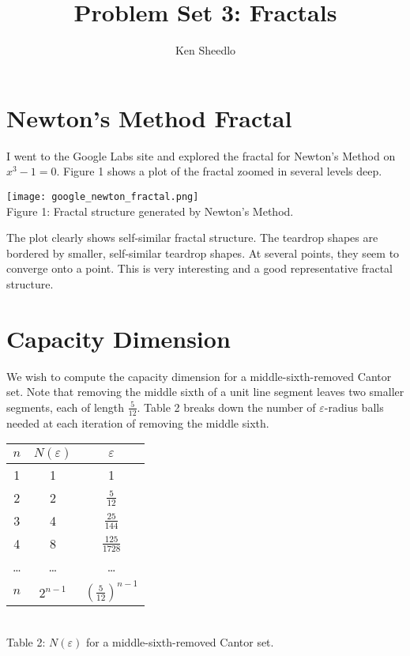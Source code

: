 \documentclass[12pt, letterpaper]{article}
\title{Problem Set 3: Fractals}
\author{Ken Sheedlo}
\begin{document}
\maketitle{}

\section*{Newton's Method Fractal}

I went to the Google Labs site and explored the fractal for Newton's Method on
$x^3 - 1 = 0$. Figure 1 shows a plot of the fractal zoomed in several levels 
deep.

\begin{center}
\texttt{[image: google\_newton\_fractal.png]}
\\
Figure 1: Fractal structure generated by Newton's Method.
\end{center}

The plot clearly shows self-similar fractal structure. The teardrop shapes are 
bordered by smaller, self-similar teardrop shapes. At several points, they seem
to converge onto a point. This is very interesting and a good representative
fractal structure.

\section*{Capacity Dimension}

We wish to compute the capacity dimension for a middle-sixth-removed Cantor set.
Note that removing the middle sixth of a unit line segment leaves two smaller
segments, each of length $\frac{5}{12}$. Table 2 breaks down the number of 
$\varepsilon$-radius balls needed at each iteration of removing the middle 
sixth.

\begin{center}
\begin{tabular}{c | c | c}
$n$ & $N(\varepsilon)$ & $\varepsilon$ \\ \hline
1 & 1 & 1 \\
2 & 2 & $\frac{5}{12}$ \\
3 & 4 & $\frac{25}{144}$ \\
4 & 8 & $\frac{125}{1728}$ \\
\ldots & \ldots & \ldots \\
$n$ & $2^{n-1}$ & $(\frac{5}{12})^{n-1}$
\end{tabular}
\\
\vspace{1.0em}
Table 2: $N(\varepsilon)$ for a middle-sixth-removed Cantor set.
\end{center}
\end{document}
